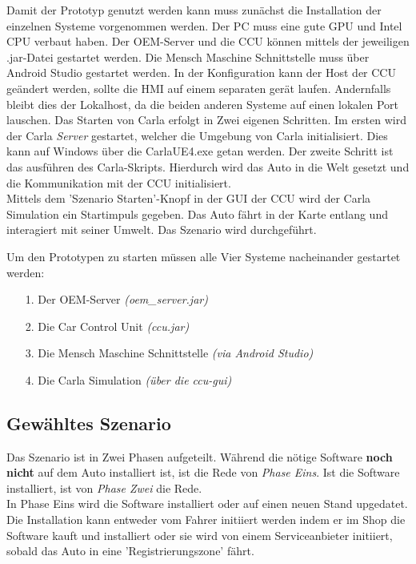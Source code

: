 Damit der Prototyp genutzt werden kann muss zunächst die Installation der einzelnen Systeme vorgenommen werden. Der PC muss eine gute GPU und Intel CPU verbaut haben. Der OEM-Server und die CCU können mittels der jeweiligen .jar-Datei gestartet werden. Die Mensch Maschine Schnittstelle muss über Android Studio gestartet werden. In der Konfiguration kann der Host der CCU geändert werden, sollte die HMI auf einem separaten gerät laufen. Andernfalls bleibt dies der Lokalhost, da die beiden anderen Systeme auf einen lokalen Port lauschen. Das Starten von Carla erfolgt in Zwei eigenen Schritten. Im ersten wird der Carla \textit{Server} gestartet, welcher die Umgebung von Carla initialisiert. Dies kann auf Windows über die CarlaUE4.exe getan werden. Der zweite Schritt ist das ausführen des Carla-Skripts. Hierdurch wird das Auto in die Welt gesetzt und die Kommunikation mit der CCU initialisiert.\\
Mittels dem 'Szenario Starten'-Knopf in der GUI der CCU  wird der Carla Simulation ein Startimpuls gegeben. Das Auto fährt in der Karte entlang und interagiert mit seiner Umwelt. Das Szenario wird durchgeführt.\\
\begin{center}
	\begin{fminipage}{0.6\textwidth}
		Um den Prototypen zu starten müssen alle Vier Systeme nacheinander gestartet werden:
		\begin{itemize}
			\item[1.] Der OEM-Server \textit{(oem\_server.jar)}
			\item[2.] Die Car Control Unit \textit{(ccu.jar)}
			\item[3.] Die Mensch Maschine Schnittstelle \textit{(via Android Studio)}
			\item[4.] Die Carla Simulation \textit{(über die ccu-gui)}
		\end{itemize}
	\end{fminipage}
\end{center}
\subsection{Gewähltes Szenario}
Das Szenario ist in Zwei Phasen aufgeteilt. Während die nötige Software \textbf{noch nicht} auf dem Auto installiert ist, ist die Rede von \textit{Phase Eins}. Ist die Software installiert, ist von \textit{Phase Zwei} die Rede.\\
In Phase Eins wird die Software installiert oder auf einen neuen Stand upgedatet. Die Installation kann entweder vom Fahrer initiiert werden indem er im Shop die Software kauft und installiert oder sie wird von einem Serviceanbieter initiiert, sobald das Auto in eine 'Registrierungszone' fährt. 

